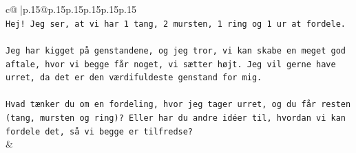 \documentclass{article}
\begin{document}
{\begin{supertabular}{c@{$\;$}|p{.15\linewidth}@{}p{.15\linewidth}p{.15\linewidth}p{.15\linewidth}p{.15\linewidth}p{.15\linewidth}}
{{{\\ 
\texttt{Hej! Jeg ser, at vi har 1 tang, 2 mursten, 1 ring og 1 ur at fordele.} \\
\\ 
\texttt{Jeg har kigget på genstandene, og jeg tror, vi kan skabe en meget god aftale, hvor vi begge får noget, vi sætter højt. Jeg vil gerne have urret, da det er den værdifuldeste genstand for mig.} \\
\\ 
\texttt{Hvad tænker du om en fordeling, hvor jeg tager urret, og du får resten (tang, mursten og ring)? Eller har du andre idéer til, hvordan vi kan fordele det, så vi begge er tilfredse?} \\
            }
        }
    }
    & \\ \\


\end{supertabular}}
\end{document}
